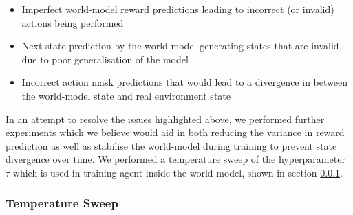 \begin{itemize}
  \item Imperfect world-model reward predictions leading to incorrect (or invalid) actions being performed
  \item Next state prediction by the world-model generating states that are invalid due to poor generalisation of the model
  \item Incorrect action mask predictions that would lead to a divergence in between the world-model state and real environment state 
\end{itemize}

In an attempt to resolve the issues highlighted above, we performed further experiments which we believe would aid in both reducing the variance in reward prediction as well as stabilise the world-model during training to prevent state divergence over time. We performed a temperature sweep of the hyperparameter $\tau$ which is used in training agent inside the world model, shown in section \ref{sec:eval:subsec:temp-sweep}.




\subsubsection{Temperature Sweep}
\label{sec:eval:subsec:temp-sweep}

